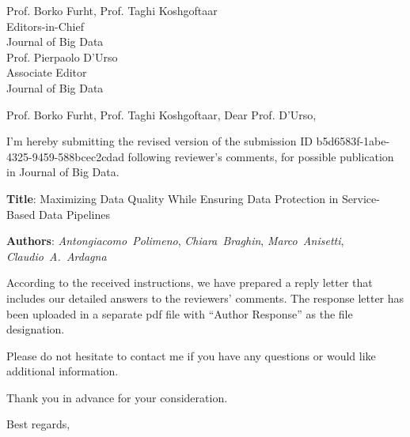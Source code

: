 \documentclass[12pt]{sriletter}
\begin{document}
\signature{\vspace*{-1.4cm}\\
    Claudio Ardagna}

\faxnumber{}

\begin{letter}{%
        Prof. Borko Furht, Prof. Taghi Koshgoftaar\\
        Editors-in-Chief\\
        Journal of Big Data\\
        \vspace{0.3cm}
        Prof. Pierpaolo D'Urso\\
        Associate Editor\\
        Journal of Big Data\\
    }

    \opening{Prof. Borko Furht, Prof. Taghi Koshgoftaar, Dear Prof. D'Urso,}

    I'm hereby submitting the revised version of the submission ID b5d6583f-1abe-4325-9459-588bcec2cdad
    following reviewer's comments, for possible publication in Journal of Big Data.

    \textbf{Title}: Maximizing Data Quality While Ensuring Data Protection in Service-Based Data Pipelines\/

    \textbf{Authors}: \emph{Antongiacomo~Polimeno}, \emph{Chiara~Braghin}, \emph{Marco~Anisetti}, \emph{Claudio~A.~Ardagna}

    According to the received instructions, we have prepared a reply letter that includes our detailed answers to the reviewers' comments. The response letter has been uploaded in a separate pdf file with ``Author Response'' as the file designation.

    Please do not hesitate to contact me if you have any questions or would like additional information.

    Thank you in advance for your consideration.

    \closing{Best regards,}

\end{letter}
\end{document}
